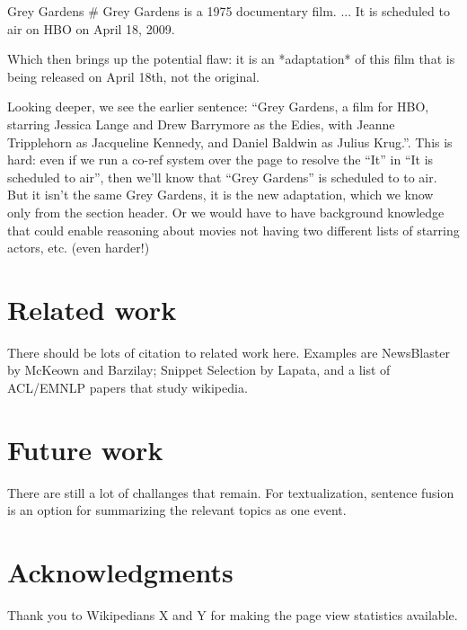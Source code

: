 \documentclass[11pt]{article}
\newcommand{\war}[1]{{\sf\small #1}}
\begin{document}
 \war{Grey Gardens} \# Grey Gardens is a 1975 documentary film. ...  It is
 scheduled to air on HBO on April 18, 2009.

 Which then brings up the potential flaw:  it is an *adaptation* of
 this film that is being released on April 18th, not the original.

 Looking deeper, we see the earlier sentence: ``Grey Gardens, a film for
 HBO, starring Jessica Lange and Drew Barrymore as the Edies, with
 Jeanne Tripplehorn as Jacqueline Kennedy, and Daniel Baldwin as Julius
 Krug.''.  This is hard: even if we run a co-ref system over the page to
 resolve the ``It'' in ``It is scheduled to air'', then we'll know that
 ``Grey Gardens'' is scheduled to to air.  But it isn't the same Grey
 Gardens, it is the new adaptation, which we know only from the section
 header.  Or we would have to have background knowledge that could
 enable reasoning about movies not having two different lists of
 starring actors, etc. (even harder!)


\section{Related work}
\label{sec:related-work}

There should be lots of citation to related work here. Examples are NewsBlaster by McKeown and Barzilay; Snippet Selection by Lapata, and a list of ACL/EMNLP papers that study wikipedia.

\section{Future work}

There are still a lot of challanges that remain. For textualization, sentence fusion is an option for summarizing the relevant topics as one event.

\section*{Acknowledgments}


Thank you to Wikipedians X and Y for making the page view statistics available.



\end{document}
